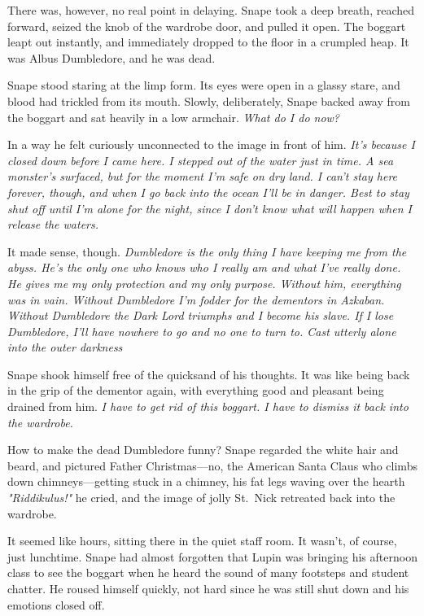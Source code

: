 There was, however, no real point in delaying. Snape took a deep breath, reached forward, seized the knob of the wardrobe door, and pulled it open. The boggart leapt out instantly, and immediately dropped to the floor in a crumpled heap. It was Albus Dumbledore, and he was dead.

Snape stood staring at the limp form. Its eyes were open in a glassy stare, and blood had trickled from its mouth. Slowly, deliberately, Snape backed away from the boggart and sat heavily in a low armchair. \emph{What do I do now?}

In a way he felt curiously unconnected to the image in front of him. \emph{It's because I closed down before I came here. I stepped out of the water just in time. A sea monster's surfaced, but for the moment I'm safe on dry land. I can't stay here forever, though, and when I go back into the ocean I'll be in danger. Best to stay shut off until I'm alone for the night, since I don't know what will happen when I release the waters.}

It made sense, though. \emph{Dumbledore is the only thing I have keeping me from the abyss. He's the only one who knows who I really am and what I've really done. He gives me my only protection and my only purpose. Without him, everything was in vain. Without Dumbledore I'm fodder for the dementors in Azkaban. Without Dumbledore the Dark Lord triumphs and I become his slave. If I lose Dumbledore, I'll have nowhere to go and no one to turn to. Cast utterly alone into the outer darkness{\el}}

Snape shook himself free of the quicksand of his thoughts. It was like being back in the grip of the dementor again, with everything good and pleasant being drained from him. \emph{I have to get rid of this boggart. I have to dismiss it back into the wardrobe.}

How to make the dead Dumbledore funny? Snape regarded the white hair and beard, and pictured Father Christmas—no, the American Santa Claus who climbs down chimneys—getting stuck in a chimney, his fat legs waving over the hearth{\el} \emph{"Riddikulus!"} he cried, and the image of jolly St.~Nick retreated back into the wardrobe.

It seemed like hours, sitting there in the quiet staff room. It wasn't, of course, just lunchtime. Snape had almost forgotten that Lupin was bringing his afternoon class to see the boggart when he heard the sound of many footsteps and student chatter. He roused himself quickly, not hard since he was still shut down and his emotions closed off.

